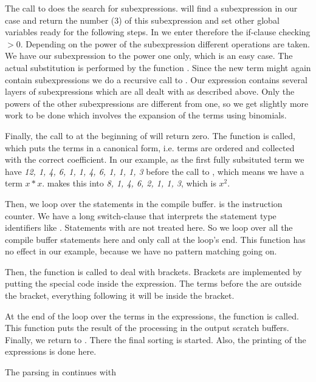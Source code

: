 The call to  does the search for subexpressions.  will
find a subexpression in our case and return the number (3) of this subexpression
and set other global variables ready for the following steps. In 
we enter therefore the if-clause checking $> 0$.  Depending on the
power of the subexpression different operations are taken. We have our
subexpression to the power one only, which is an easy case. The actual
substitution is performed by the function . Since the new term
might again contain subexpressions we do a recursive call to .
Our expression contains several layers of subexpressions which are all dealt
with as described above. Only the powers of the other subexpressions are
different from one, so we get slightly more work to be done which involves the
expansion of the terms using binomials. 

Finally, the call to  at the beginning of  will
return zero. The function  is called, which puts the terms in a
canonical form, i.e. terms are ordered and collected with the correct
coefficient. In our example, as the first fully subsituted term we have
{\it 12, 1, 4, 6, 1, 1, 4, 6, 1, 1, 1, 3} before the call to
, which means we have a term $x*x$. 
makes this into {\it 8, 1, 4, 6, 2, 1, 1, 3}, which is $x^2$.

Then, we loop over the statements in the compile buffer.  is the
instruction counter. We have a long switch-clause that interprets the statement
type identifiers like . Statements with  are not
treated here. So we loop over all the compile buffer statements here and only
call  at the loop's end. This function has no effect in our
example, because we have no pattern matching going on.

Then, the function  is called to deal with brackets. Brackets
are implemented by putting the special code  inside the expression.
The terms before the  are outside the bracket, everything following it
will be inside the bracket. 

At the end of the loop over the terms in the expressions, the function
 is called. This function puts the result of the processing in
the output scratch buffers. Finally, we return to . There the
final sorting is started. Also, the printing of the expressions is done here.

The parsing in  continues with

